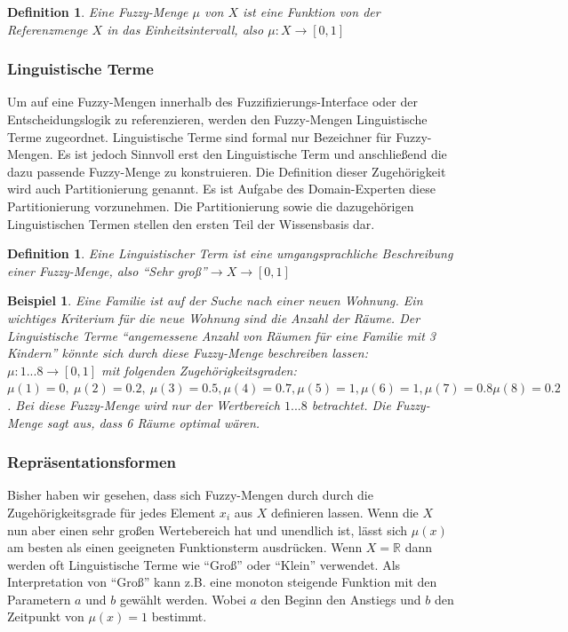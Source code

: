 \documentclass[12pt,a4paper,bibliography=totocnumbered,listof=totocnumbered]{article}
\theoremstyle{Umgebung}
\begin{document}
\newtheorem{fuzzymenge}{Definition}
\begin{fuzzymenge}
Eine Fuzzy-Menge $\mu$ von $X$ ist eine Funktion von der Referenzmenge
$X$ in das Einheitsintervall, also $\mu : X \rightarrow \left [0,1\right]$
\end{fuzzymenge}

\subsubsection{Linguistische Terme}

Um auf eine Fuzzy-Mengen innerhalb des Fuzzifizierungs-Interface oder der Entscheidungslogik zu referenzieren, werden den Fuzzy-Mengen Linguistische Terme zugeordnet. Linguistische Terme sind formal nur Bezeichner für Fuzzy-Mengen. Es ist jedoch Sinnvoll erst den Linguistische Term und anschließend die dazu passende Fuzzy-Menge zu konstruieren. Die Definition dieser Zugehörigkeit wird auch Partitionierung genannt. Es ist Aufgabe des Domain-Experten diese Partitionierung vorzunehmen. Die Partitionierung sowie die dazugehörigen Linguistischen Termen stellen den ersten Teil der Wissensbasis dar.

\newtheorem{fuzzyterm}{Definition}
\begin{fuzzyterm}
Eine Linguistischer Term ist eine umgangsprachliche Beschreibung einer Fuzzy-Menge, also \enquote{Sehr groß}$\rightarrow X \rightarrow \left[0,1\right]$
\end{fuzzyterm}

\newtheorem{Bsp}{Beispiel}
\begin{Bsp} 
Eine Familie ist auf der Suche nach einer neuen Wohnung. Ein wichtiges Kriterium für die neue Wohnung sind die Anzahl der Räume. Der Linguistische Terme \enquote{angemessene Anzahl von Räumen für eine Familie mit 3 Kindern} könnte sich durch diese Fuzzy-Menge beschreiben lassen: $\mu: {1...8} \rightarrow  \left[0,1\right]$ mit folgenden Zugehörigkeitsgraden: $\mu(1) = 0,\:\mu(2) = 0.2,\:\mu(3) = 0.5, \mu(4) = 0.7,\mu(5) = 1, \mu(6) = 1, \mu(7) = 0.8
\mu(8) = 0.2$. Bei diese Fuzzy-Menge wird nur der Wertbereich $1...8$ betrachtet. Die Fuzzy-Menge sagt aus, dass 6 Räume optimal wären.
\end{Bsp} 

\label{representationsformen}
\subsubsection{Repräsentationsformen}

Bisher haben wir gesehen, dass sich Fuzzy-Mengen durch durch die Zugehörigkeitsgrade für jedes Element $x_i$ aus $X$ definieren lassen. Wenn die $X$ nun aber einen sehr großen Wertebereich hat und unendlich ist, lässt sich $\mu(x)$ am besten als einen geeigneten Funktionsterm ausdrücken. Wenn $X = \mathbb{R}$ dann werden oft Linguistische Terme wie \enquote{Groß} oder \enquote{Klein} verwendet. Als Interpretation von \enquote{Groß} kann z.B. eine monoton steigende Funktion mit den Parametern $a$ und $b$ gewählt werden. Wobei $a$ den Beginn den Anstiegs und $b$ den Zeitpunkt von $\mu(x) = 1$ bestimmt.
\end{document}
